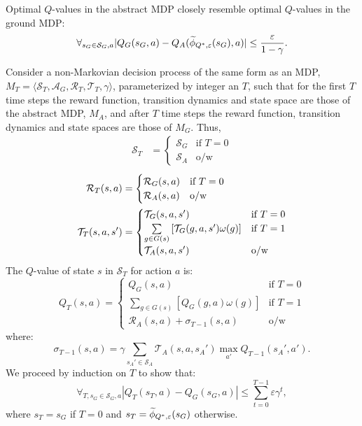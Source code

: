 \begin{clm}
\label{clm:closeQs}
Optimal $Q$-values in the abstract \ac{MDP} closely resemble optimal $Q$-values in the ground \ac{MDP}:
\begin{equation}
\label{eq:Q*Claim1}
\forall_{s_G \in \mathcal{S}_G, a} |Q_G(s_G, a) - Q_A(\widetilde \phi_{Q^*,\varepsilon}(s_G), a)| \leq \frac{\varepsilon}{1-\gamma}.
\end{equation}
\end{clm}

Consider a non-Markovian decision process of the same form as an \ac{MDP}, $M_T = \langle \mathcal{S}_T, \mathcal{A}_G, \mathcal{R}_T, \mathcal{T}_T, \gamma \rangle$, parameterized by integer an $T$, such that for the first $T$ time steps the reward function, transition dynamics and state space are those of the abstract MDP, $M_A$, and after $T$ time steps the reward function, transition dynamics and state spaces are those of $M_G$. Thus,
\begin{align*}
\mathcal{S}_T &= \begin{cases}
\mathcal{S}_G& \text{if } T = 0 \\
\mathcal{S}_A& \text{o/w}
\end{cases}
\end{align*}
\begin{align*}
\mathcal{R}_T(s,a) &= \begin{cases}
\mathcal{R}_G(s,a)& \text{if } T = 0\\
\mathcal{R}_A(s, a)& \text{o/w}
\end{cases}\\
\mathcal{T}_T(s,a,s') &= \begin{cases}
\mathcal{T}_G(s,a,s')& \text{if }T = 0\\
\underset{{g \in G(s)}}{\sum}\left[\mathcal{T}_G(g, a, s') \omega(g) \right]& \text{if } T = 1\\
\mathcal{T}_A(s,a,s')& \text{o/w}
\end{cases}
\end{align*}
The $Q$-value of state $s$ in $\mathcal{S}_T$ for action $a$ is:
\begin{equation}
Q_T(s, a) = 
\begin{cases}
	   Q_G(s, a) &  \text{if } T=0\\
	   \underset{g \in G(s)}{\sum} \left[ Q_G(g,a) \omega(g) \right] & \text{if } T = 1\\
	   \mathcal{R}_A(s,a) + \sigma_{T-1}(s,a) &\text{o/w}
\end{cases}
\end{equation}
where:
\begin{equation*}
\sigma_{T-1}(s,a) = \gamma \underset{{s_A}' \in \mathcal{S}_A}{\sum} \mathcal{T}_A(s,a,{s_A}') \max_{a'} Q_{T-1}({s_A}', a').
\end{equation*}
We proceed by induction on $T$ to show that:
\begin{equation}
\label{eq:clm1Induct}
\forall_{T, s_G \in \mathcal{S}_G, a} |Q_T(s_T, a) - Q_G(s_G, a) | \leq \sum_{t=0}^{T-1} \varepsilon \gamma^{t},
\end{equation}
where $s_T = s_G$ if $T=0$ and $s_T = \widetilde \phi_{Q^*,\varepsilon}(s_G)$ otherwise. \\

